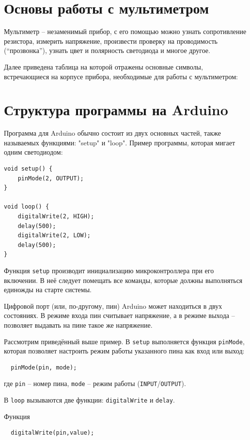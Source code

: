 \documentclass[a4paper,twoside]{book}
\begin{document}
\section{Основы работы с мультиметром}
Мультиметр -- незаменимый прибор, с его помощью можно узнать сопротивление
резистора, измерить напряжение, произвести проверку на проводимость
(``прозвонка''), узнать цвет и полярность светодиода и многое другое.

Далее приведена таблица на которой отражены основные символы, встречающиеся на
корпусе прибора, необходимые для работы с мультиметром:

\section{Структура программы на Arduino}

Программа для Arduino обычно состоит из двух основных частей, также называемых
функциями: "setup" и "loop". Пример программы, которая мигает одним светодиодом:
\begin{verbatim}
void setup() {
    pinMode(2, OUTPUT);
}

void loop() {
    digitalWrite(2, HIGH);
    delay(500);
    digitalWrite(2, LOW);
    delay(500);
}
\end{verbatim}

Функция \texttt{setup} производит инициализацию микроконтроллера при его
включении. В неё следует помещать все команды, которые должны выполняться
единожды на старте системы.

Цифровой порт (или, по-другому, пин) Arduino может находиться в двух состояниях.
В режиме входа пин считывает напряжение, а в режиме выхода – позволяет выдавать
на пине такое же напряжение.

Рассмотрим приведённый выше пример. В \texttt{setup} выполняется функция
\texttt{pinMode}, которая позволяет настроить режим работы указанного пина как
вход или выход:

\begin{verbatim}
  pinMode(pin, mode);
\end{verbatim}

где \texttt{pin} -- номер пина, \texttt{mode} -- режим работы
(\texttt{INPUT}/\texttt{OUTPUT}).

В \texttt{loop} вызываются две функции: \texttt{digitalWrite} и \texttt{delay}.

Функция
\begin{verbatim}
  digitalWrite(pin,value);
\end{verbatim}
\end{document}
